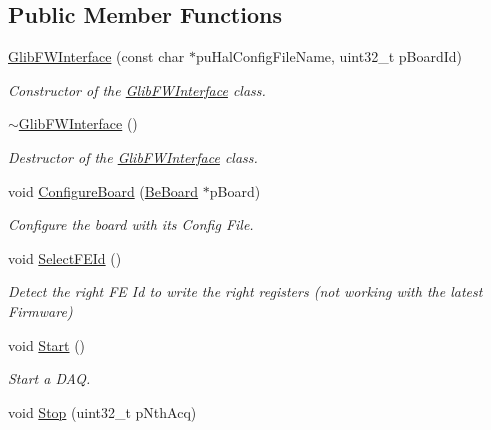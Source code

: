 \subsection*{Public Member Functions}
\begin{DoxyCompactItemize}
\item 
\hyperlink{class_ph2___hw_interface_1_1_glib_f_w_interface_aef1044c390e934afa17cdf9566ac71c3}{Glib\-F\-W\-Interface} (const char $\ast$pu\-Hal\-Config\-File\-Name, uint32\-\_\-t p\-Board\-Id)
\begin{DoxyCompactList}\small\item\em Constructor of the \hyperlink{class_ph2___hw_interface_1_1_glib_f_w_interface}{Glib\-F\-W\-Interface} class. \end{DoxyCompactList}\item 
\hyperlink{class_ph2___hw_interface_1_1_glib_f_w_interface_a8cd8fec61b8e8327b142beddcd512b34}{$\sim$\-Glib\-F\-W\-Interface} ()
\begin{DoxyCompactList}\small\item\em Destructor of the \hyperlink{class_ph2___hw_interface_1_1_glib_f_w_interface}{Glib\-F\-W\-Interface} class. \end{DoxyCompactList}\item 
void \hyperlink{class_ph2___hw_interface_1_1_glib_f_w_interface_a52658cd813658d4fae48a79bdabaa5cc}{Configure\-Board} (\hyperlink{class_ph2___hw_description_1_1_be_board}{Be\-Board} $\ast$p\-Board)
\begin{DoxyCompactList}\small\item\em Configure the board with its Config File. \end{DoxyCompactList}\item 
void \hyperlink{class_ph2___hw_interface_1_1_glib_f_w_interface_a2ce120711b8a58610f779813064d2c8f}{Select\-F\-E\-Id} ()
\begin{DoxyCompactList}\small\item\em Detect the right F\-E Id to write the right registers (not working with the latest Firmware) \end{DoxyCompactList}\item 
void \hyperlink{class_ph2___hw_interface_1_1_glib_f_w_interface_adebd47ee3a84dbb8b60f6dd521921aac}{Start} ()
\begin{DoxyCompactList}\small\item\em Start a D\-A\-Q. \end{DoxyCompactList}\item 
void \hyperlink{class_ph2___hw_interface_1_1_glib_f_w_interface_ad980b1ab04d9f87f1a26978201e42997}{Stop} (uint32\-\_\-t p\-Nth\-Acq)

\end{DoxyCompactItemize}
